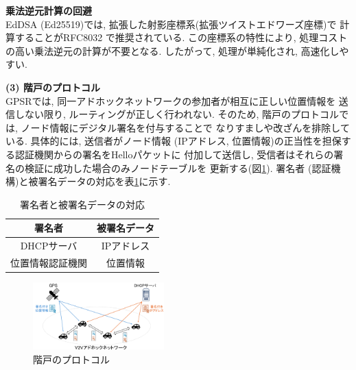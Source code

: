 \documentclass[a4j,9pt,twocolumn]{jsarticle}
\begin{document}
\smallskip
\begin{description}[labelwidth=3mm, labelsep=2mm]
    \item[(iii)] \textbf{乗法逆元計算の回避}\\
    EdDSA (Ed25519)では, 拡張した射影座標系(拡張ツイストエドワーズ座標)で
    計算することがRFC8032 \cite{8032}で推奨されている.
    この座標系の特性により, 処理コストの高い乗法逆元の計算が不要となる.
    したがって, 処理が単純化され,  高速化しやすい. 
\end{description}
\smallskip
\noindent\textbf{(3) 階戸のプロトコル}\\
\indent GPSRでは, 同一アドホックネットワークの参加者が相互に正しい位置情報を
送信しない限り, ルーティングが正しく行われない. そのため, 
階戸のプロトコル\cite{shinato}では, ノード情報にデジタル署名を付与することで
なりすましや改ざんを排除している. 具体的には, 送信者がノード情報 
(IPアドレス, 位置情報)の正当性を担保する認証機関からの署名をHelloパケットに
付加して送信し, 受信者はそれらの署名の検証に成功した場合のみノードテーブルを
更新する(図\ref{fig:introduce}). 
署名者 (認証機構)と被署名データの対応を表\ref{tab:sign}に示す. 
\vspace{-3mm}
\begin{table}[h]
    \centering
    \caption{署名者と被署名データの対応\cite{shinato}}
    \label{tab:sign}
    \begin{tabular}{cc} \hline
        署名者 & 被署名データ \\ \hline \hline
        DHCPサーバ & IPアドレス \\
        位置情報認証機関 & 位置情報 \\ \hline
    \end{tabular}
\end{table}
\vspace{-5mm} %
\begin{figure}[h]
    \centering
    \includegraphics[width=0.45\textwidth]{figures/introduce.png}
    \caption{階戸のプロトコル\cite{shinato}}
    \label{fig:introduce}
\end{figure}
\vspace{-5mm}
\end{document}
